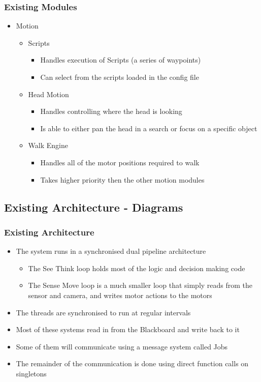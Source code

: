 \documentclass{beamer}
\begin{document}
\begin{frame}
	\frametitle{Existing Modules}
	\begin{itemize}
		\item Motion
			\begin{itemize}
				\item Scripts
					\begin{itemize}
						\item Handles execution of Scripts (a series of waypoints)
						\item Can select from the scripts loaded in the config file
					\end{itemize}
				\item Head Motion
					\begin{itemize}
						\item Handles controlling where the head is looking
						\item Is able to either pan the head in a search or focus on a specific object
					\end{itemize}
				\item Walk Engine
					\begin{itemize}
						\item Handles all of the motor positions required to walk
						\item Takes higher priority then the other motion modules
					\end{itemize}
			\end{itemize}
	\end{itemize}
\end{frame}

\subsection{Existing Architecture - Diagrams}
\begin{frame}
	\frametitle{Existing Architecture}
	\begin{itemize}
		\item The system runs in a synchronised dual pipeline architecture
			\begin{itemize}
				\item The See Think loop holds most of the logic and decision making code
				\item The Sense Move loop is a much smaller loop that simply reads from the sensor and camera, and writes motor actions to the motors
			\end{itemize}
		\item The threads are synchronised to run at regular intervals
		\item Most of these systems read in from the Blackboard and write back to it
		\item Some of them will communicate using a message system called Jobs
		\item The remainder of the communication is done using direct function calls on singletons
	\end{itemize}
\end{frame}
\end{document}
